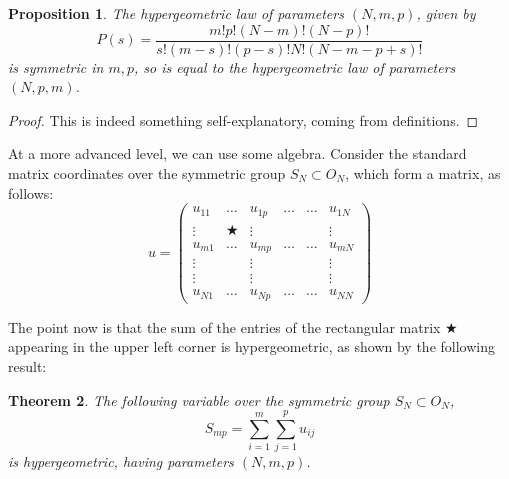 \documentclass[12pt]{amsbook}
\newtheorem{theorem}{Theorem}[chapter]
\newtheorem{proposition}[theorem]{Proposition}
\begin{document}
\begin{proposition}
The hypergeometric law of parameters $(N,m,p)$, given by
$$P(s)=\frac{m!p!(N-m)!(N-p)!}{s!(m-s)!(p-s)!N!(N-m-p+s)!}$$
is symmetric in $m,p$, so is equal to the hypergeometric law of parameters $(N,p,m)$.
\end{proposition}

\begin{proof}
This is indeed something self-explanatory, coming from definitions.
\end{proof}

At a more advanced level, we can use some algebra. Consider the standard matrix coordinates over the symmetric group $S_N\subset O_N$, which form a matrix, as follows:
$$u=\begin{pmatrix}
u_{11}&\ldots&u_{1p}&\ldots&\ldots&u_{1N}\\
\vdots&\bigstar&\vdots&&&\vdots\\
u_{m1}&\ldots&u_{mp}&\ldots&\ldots&u_{mN}\\
\vdots&&\vdots&&&\vdots\\
\vdots&&\vdots&&&\vdots\\
u_{N1}&\ldots&u_{Np}&\ldots&\ldots&u_{NN}
\end{pmatrix}$$

The point now is that the sum of the entries of the rectangular matrix $\bigstar$ appearing in the upper left corner is hypergeometric, as shown by the following result:


\begin{theorem}
The following variable over the symmetric group $S_N\subset O_N$,
$$S_{mp}=\sum_{i=1}^m\sum_{j=1}^pu_{ij}$$
is hypergeometric, having parameters $(N,m,p)$.
\end{theorem}
\end{document}
